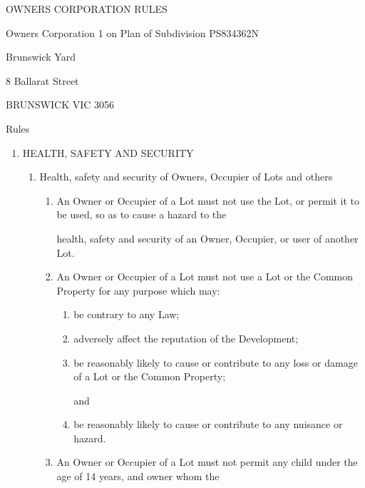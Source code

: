\documentclass{article}
\begin{document}

{\fontsize{13.98}{1}OWNERS CORPORATION RULES }

{\fontsize{10.98}{1}Owners Corporation 1 on Plan of Subdivision PS834362N }

{\fontsize{10.98}{1}Brunswick Yard }

{\fontsize{10.98}{1}8 Ballarat Street }

{\fontsize{10.98}{1}BRUNSWICK VIC 3056 }

\newpage

{\fontsize{10.02}{1}Rules }

\begin{enumerate}[label=\arabic*.]
\item {\fontsize{9.99}{1} HEALTH, SAFETY AND SECURITY }

\begin{enumerate}[label=\arabic{enumi}.\arabic*.]
\item {\fontsize{9.99}{1} Health, safety and security of Owners, Occupier of Lots and others }

\begin{enumerate}[label=(\arabic*)]
\item {\fontsize{9.962}{1} An Owner or Occupier of a Lot must not use the Lot, or permit it to be used, so as to cause a hazard to the }

{\fontsize{10.02}{1}health, safety and security of an Owner, Occupier, or user of another Lot. }

\item {\fontsize{9.962}{1} An Owner or Occupier of a Lot must not use a Lot or the Common Property for any purpose which may: }

\begin{enumerate}[label=(\alph*)]
\item {\fontsize{9.962}{1} be contrary to any Law; }

\item {\fontsize{9.962}{1} adversely affect the reputation of the Development;  }

\item {\fontsize{9.962}{1} be reasonably likely to cause or contribute to any loss or damage of a Lot or the Common Property; }

{\fontsize{10.02}{1}and }

\item {\fontsize{9.962}{1} be reasonably likely to cause or contribute to any nuisance or hazard. }

\end{enumerate}
\item {\fontsize{9.962}{1} An Owner or Occupier of a Lot must not permit any child under the age of 14 years, and owner whom the }


\end{enumerate}
\end{enumerate}
\end{enumerate}
\end{document}
